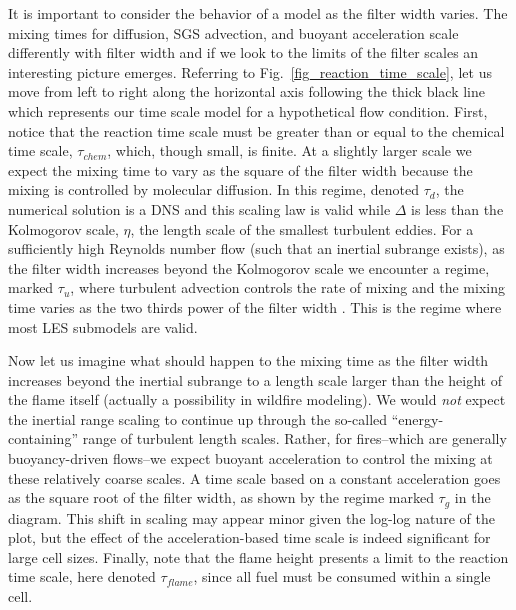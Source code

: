 It is important to consider the behavior of a model as the filter width varies. The mixing times for diffusion, SGS advection, and buoyant acceleration scale differently with filter width and if we look to the limits of the filter scales an interesting picture emerges.  Referring to Fig.~\ref{fig_reaction_time_scale}, let us move from left to right along the horizontal axis following the thick black line which represents our time scale model for a hypothetical flow condition.  First, notice that the reaction time scale must be greater than or equal to the chemical time scale, $\tau_{chem}$, which, though small, is finite. At a slightly larger scale we expect the mixing time to vary as the square of the filter width because the mixing is controlled by molecular diffusion.  In this regime, denoted $\tau_d$, the numerical solution is a DNS and this scaling law is valid while $\Delta$ is less than the Kolmogorov scale, $\eta$, the length scale of the smallest turbulent eddies. For a sufficiently high Reynolds number flow (such that an inertial subrange exists), as the filter width increases beyond the Kolmogorov scale we encounter a regime, marked $\tau_u$, where turbulent advection controls the rate of mixing and the mixing time varies as the two thirds power of the filter width \cite{Pope:2000}.  This is the regime where most LES submodels are valid.

Now let us imagine what should happen to the mixing time as the filter width increases beyond the inertial subrange to a length scale larger than the height of the flame itself (actually a possibility in wildfire modeling). We would \emph{not} expect the inertial range scaling to continue up through the so-called ``energy-containing'' range of turbulent length scales.  Rather, for fires--which are generally buoyancy-driven flows--we expect buoyant acceleration to control the mixing at these relatively coarse scales.  A time scale based on a constant acceleration goes as the square root of the filter width, as shown by the regime marked $\tau_g$ in the diagram.  This shift in scaling may appear minor given the log-log nature of the plot, but the effect of the acceleration-based time scale is indeed significant for large cell sizes.  Finally, note that the flame height presents a limit to the reaction time scale, here denoted $\tau_{flame}$, since all fuel must be consumed within a single cell.

